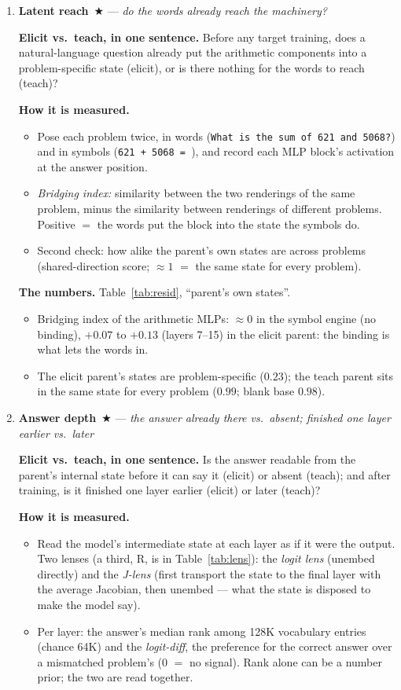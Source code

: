 \documentclass[11pt]{article}
\newcommand{\what}[1]{\par\noindent\textbf{Elicit vs.\ teach, in one sentence.} #1}
\newcommand{\how}[1]{\par\noindent\textbf{How it is measured.} #1}
\newcommand{\numbers}[1]{\par\noindent\textbf{The numbers.} #1\par\medskip}
\newenvironment{steps}{\begin{itemize}[nosep,leftmargin=1.2em,topsep=2pt]}{\end{itemize}}
\newcommand{\metricsecp}[2]{\item \textbf{#1}~$\bigstar$ --- \emph{#2}}
\begin{document}
\begin{enumerate}[label=\textbf{M\arabic*}, leftmargin=*, itemsep=1.2em, resume]
\metricsecp{Latent reach}{do the words already reach the machinery?}
\what{Before any target training, does a natural-language question already put the arithmetic
components into a problem-specific state (elicit), or is there nothing for the words to reach
(teach)?}
\how{
\begin{steps}
\item Pose each problem twice, in words (\texttt{What is the sum of 621 and 5068?}) and in
symbols (\texttt{621 + 5068 = }), and record each MLP block's activation at the answer position.
\item \emph{Bridging index:} similarity between the two renderings of the same problem, minus
the similarity between renderings of different problems. Positive $=$ the words put the block
into the state the symbols do.
\item Second check: how alike the parent's own states are across problems (shared-direction
score; $\approx1$ $=$ the same state for every problem).
\end{steps}}
\numbers{Table~\ref{tab:resid}, ``parent's own states''.
\begin{steps}
\item Bridging index of the arithmetic MLPs: $\approx0$ in the symbol engine (no binding),
$+0.07$ to $+0.13$ (layers 7--15) in the elicit parent: the binding is what lets the words in.
\item The elicit parent's states are problem-specific ($0.23$); the teach parent sits in the
same state for every problem ($0.99$; blank base $0.98$).
\end{steps}}
\metricsecp{Answer depth}{the answer already there vs.\ absent; finished one layer earlier vs.\ later}
\what{Is the answer readable from the parent's internal state before it can say it (elicit) or
absent (teach); and after training, is it finished one layer earlier (elicit) or later (teach)?}
\how{
\begin{steps}
\item Read the model's intermediate state at each layer as if it were the output. Two lenses
(a third, R, is in Table~\ref{tab:lens}): the \emph{logit lens} (unembed directly) and the
\emph{J-lens} (first transport the state to the final layer with the average Jacobian, then
unembed --- what the state is disposed to make the model say).
\item Per layer: the answer's median rank among 128K vocabulary entries (chance 64K) and the
\emph{logit-diff}, the preference for the correct answer over a mismatched problem's (0 $=$ no
signal). Rank alone can be a number prior; the two are read together.

\end{steps}}
\end{enumerate}
\end{document}
